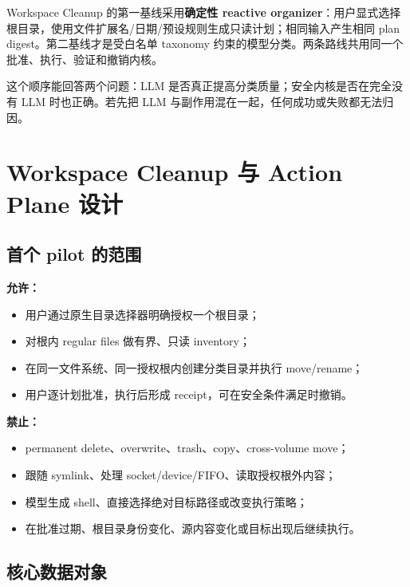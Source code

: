 \documentclass[UTF8,fontset=none,zihao=-4,openany]{ctexrep}
\begin{document}
\begin{decisionbox}
Workspace Cleanup 的第一基线采用\textbf{确定性 reactive organizer}：用户显式选择根目录，使用文件扩展名/日期/预设规则生成只读计划；相同输入产生相同 plan digest。第二基线才是受白名单 taxonomy 约束的模型分类。两条路线共用同一个批准、执行、验证和撤销内核。
\end{decisionbox}

这个顺序能回答两个问题：LLM 是否真正提高分类质量；安全内核是否在完全没有 LLM 时也正确。若先把 LLM 与副作用混在一起，任何成功或失败都无法归因。

\chapter{Workspace Cleanup 与 Action Plane 设计}

\section{首个 pilot 的范围}

\textbf{允许：}
\begin{itemize}
  \item 用户通过原生目录选择器明确授权一个根目录；
  \item 对根内 regular files 做有界、只读 inventory；
  \item 在同一文件系统、同一授权根内创建分类目录并执行 move/rename；
  \item 用户逐计划批准，执行后形成 receipt，可在安全条件满足时撤销。
\end{itemize}

\textbf{禁止：}
\begin{itemize}
  \item permanent delete、overwrite、trash、copy、cross-volume move；
  \item 跟随 symlink、处理 socket/device/FIFO、读取授权根外内容；
  \item 模型生成 shell、直接选择绝对目标路径或改变执行策略；
  \item 在批准过期、根目录身份变化、源内容变化或目标出现后继续执行。
\end{itemize}

\section{核心数据对象}
\end{document}

